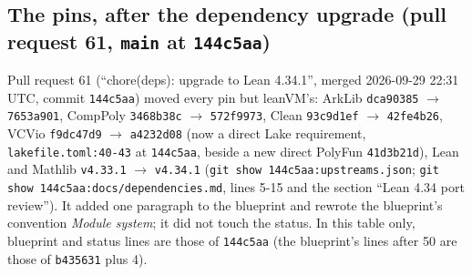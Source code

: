 \subsection{The pins, after the dependency upgrade (pull request 61, \texttt{main} at \texttt{144c5aa})}\label{sec:docs-pins}

\begin{sloppypar}
Pull request 61 (``chore(deps): upgrade to Lean 4.34.1'', merged 2026-09-29 22:31 UTC, commit \texttt{144c5aa}) moved every pin but leanVM's: ArkLib \texttt{dca90385} \ensuremath{→} \texttt{7653a901}, CompPoly \texttt{3468b38c} \ensuremath{→} \texttt{572f9973}, Clean \texttt{93c9d1ef} \ensuremath{→} \texttt{42fe4b26}, VCVio \texttt{f9dc47d9} \ensuremath{→} \texttt{a4232d08} (now a direct Lake requirement, \texttt{lakefile.\allowbreak{}toml:\allowbreak{}40-\allowbreak{}43} at \texttt{144c5aa}, beside a new direct PolyFun \texttt{41d3b21d}), Lean and Mathlib \texttt{v4.\allowbreak{}33.\allowbreak{}1} \ensuremath{→} \texttt{v4.\allowbreak{}34.\allowbreak{}1} (\texttt{git show 144c5aa:\allowbreak{}upstreams.\allowbreak{}json}; \texttt{git show 144c5aa:\allowbreak{}docs/\allowbreak{}dependencies.\allowbreak{}md}, lines 5-15 and the section ``Lean 4.34 port review''). It added one paragraph to the blueprint and rewrote the blueprint's convention \emph{Module system}; it did not touch the status. In this table only, blueprint and status lines are those of \texttt{144c5aa} (the blueprint's lines after 50 are those of \texttt{b435631} plus 4).
\end{sloppypar}

